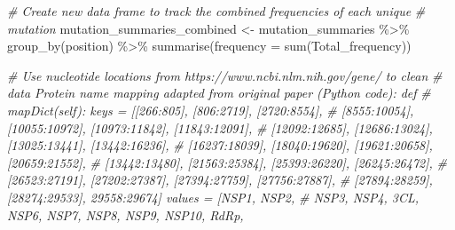 \documentclass{article}
\newenvironment{Shaded}{\begin{snugshade}}{\end{snugshade}}
\newcommand{\AttributeTok}[1]{\textcolor[rgb]{0.77,0.63,0.00}{#1}}
\newcommand{\CommentTok}[1]{\textcolor[rgb]{0.56,0.35,0.01}{\textit{#1}}}
\newcommand{\FunctionTok}[1]{\textcolor[rgb]{0.00,0.00,0.00}{#1}}
\newcommand{\NormalTok}[1]{#1}
\newcommand{\OtherTok}[1]{\textcolor[rgb]{0.56,0.35,0.01}{#1}}
\newcommand{\SpecialCharTok}[1]{\textcolor[rgb]{0.00,0.00,0.00}{#1}}
\begin{document}
\begin{Shaded}
\begin{Highlighting}[]
\CommentTok{\# Create new data frame to track the combined frequencies of each unique}
\CommentTok{\# mutation}
\NormalTok{mutation\_summaries\_combined }\OtherTok{\textless{}{-}}\NormalTok{ mutation\_summaries }\SpecialCharTok{\%\textgreater{}\%}
    \FunctionTok{group\_by}\NormalTok{(position) }\SpecialCharTok{\%\textgreater{}\%}
    \FunctionTok{summarise}\NormalTok{(}\AttributeTok{frequency =} \FunctionTok{sum}\NormalTok{(Total\_frequency))}

\CommentTok{\# Use nucleotide locations from https://www.ncbi.nlm.nih.gov/gene/ to clean}
\CommentTok{\# data Protein name mapping adapted from original paper (Python code): def}
\CommentTok{\# mapDict(self): keys = [\textquotesingle{}[266:805]\textquotesingle{}, \textquotesingle{}[806:2719]\textquotesingle{}, \textquotesingle{}[2720:8554]\textquotesingle{},}
\CommentTok{\# \textquotesingle{}[8555:10054]\textquotesingle{}, \textquotesingle{}[10055:10972]\textquotesingle{}, \textquotesingle{}[10973:11842]\textquotesingle{}, \textquotesingle{}[11843:12091]\textquotesingle{},}
\CommentTok{\# \textquotesingle{}[12092:12685]\textquotesingle{}, \textquotesingle{}[12686:13024]\textquotesingle{}, \textquotesingle{}[13025:13441]\textquotesingle{}, \textquotesingle{}[13442:16236]\textquotesingle{},}
\CommentTok{\# \textquotesingle{}[16237:18039]\textquotesingle{}, \textquotesingle{}[18040:19620]\textquotesingle{}, \textquotesingle{}[19621:20658]\textquotesingle{}, \textquotesingle{}[20659:21552]\textquotesingle{},}
\CommentTok{\# \textquotesingle{}[13442:13480]\textquotesingle{}, \textquotesingle{}[21563:25384]\textquotesingle{}, \textquotesingle{}[25393:26220]\textquotesingle{}, \textquotesingle{}[26245:26472]\textquotesingle{},}
\CommentTok{\# \textquotesingle{}[26523:27191]\textquotesingle{}, \textquotesingle{}[27202:27387]\textquotesingle{}, \textquotesingle{}[27394:27759]\textquotesingle{}, \textquotesingle{}[27756:27887]\textquotesingle{},}
\CommentTok{\# \textquotesingle{}[27894:28259]\textquotesingle{}, \textquotesingle{}[28274:29533]\textquotesingle{}, \textquotesingle{}29558:29674\textquotesingle{}] values = [\textquotesingle{}NSP1\textquotesingle{}, \textquotesingle{}NSP2\textquotesingle{},}
\CommentTok{\# \textquotesingle{}NSP3\textquotesingle{}, \textquotesingle{}NSP4\textquotesingle{}, \textquotesingle{}3CL\textquotesingle{}, \textquotesingle{}NSP6\textquotesingle{}, \textquotesingle{}NSP7\textquotesingle{}, \textquotesingle{}NSP8\textquotesingle{}, \textquotesingle{}NSP9\textquotesingle{}, \textquotesingle{}NSP10\textquotesingle{}, \textquotesingle{}RdRp\textquotesingle{},}

\end{Highlighting}
\end{Shaded}
\end{document}
